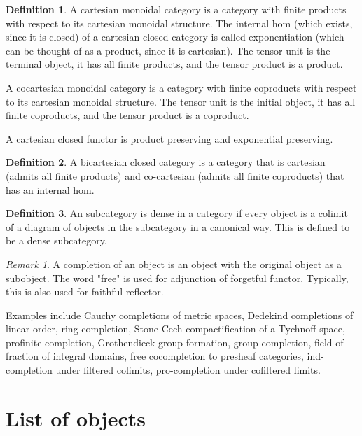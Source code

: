\documentclass[10pt]{article}
\theoremstyle{plain}%
\theoremstyle{definition}
\newtheorem{definition}{Definition}[section]
\theoremstyle{remark}
\newtheorem*{remark}{Remark}
\begin{document}
\begin{definition}
    A cartesian monoidal category is a category with finite products with respect to its cartesian monoidal structure. The internal hom (which exists, since it is closed) of a cartesian closed category is called exponentiation (which can be thought of as a product, since it is cartesian). The tensor unit is the terminal object, it has all finite products, and the tensor product is a product. 

    A cocartesian monoidal category is a category with finite coproducts with respect to its cartesian monoidal structure. The tensor unit is the initial object, it has all finite coproducts, and the tensor product is a coproduct. 

    A cartesian closed functor is product preserving and exponential preserving.
\end{definition}

\begin{definition}
    A bicartesian closed category is a category that is cartesian (admits all finite products) and co-cartesian (admits all finite coproducts) that has an internal hom.
\end{definition}

\begin{definition}
    An subcategory is dense in a category if every object is a colimit of a diagram of objects in the subcategory in a canonical way.
    This is defined to be a dense subcategory.
\end{definition}

\begin{remark}
    A completion of an object is an object with the original object as a subobject. The word "free" is used for adjunction of forgetful functor. Typically, this is also used for faithful reflector.

    Examples include Cauchy completions of metric spaces, Dedekind completions of linear order, ring completion, Stone-Cech compactification of a Tychnoff space, profinite completion, Grothendieck group formation, group completion, field of fraction of integral domains, free cocompletion to presheaf categories, ind-completion under filtered colimits, pro-completion under cofiltered limits.
\end{remark}

\section{List of objects}
\end{document}
